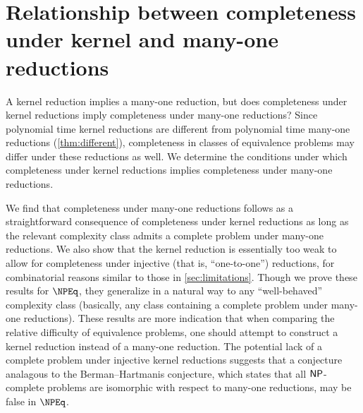 \section
    [Relationship between completeness under kernel and many-one reductions]
    {Relationship between completeness \\ under kernel and many-one reductions}
\label{sec:npeqcompleteness}
%
A kernel reduction implies a many-one reduction, but does completeness under kernel reductions imply completeness under many-one reductions?
Since polynomial time kernel reductions are different from polynomial time many-one reductions (\autoref{thm:different}), completeness in classes of equivalence problems may differ under these reductions as well.
We determine the conditions under which completeness under kernel reductions implies completeness under many-one reductions.

%
We find that completeness under many-one reductions follows as a straightforward consequence of completeness under kernel reductions as long as the relevant complexity class admits a complete problem under many-one reductions.
We also show that the kernel reduction is essentially too weak to allow for completeness under injective (that is, ``one-to-one'') reductions, for combinatorial reasons similar to those in \autoref{sec:limitations}.
Though we prove these results for $\NPEq$, they generalize in a natural way to any ``well-behaved'' complexity class (basically, any class containing a complete problem under many-one reductions).
These results are more indication that when comparing the relative difficulty of equivalence problems, one should attempt to construct a kernel reduction instead of a many-one reduction.
The potential lack of a complete problem under injective kernel reductions suggests that a conjecture analagous to the Berman--Hartmanis conjecture, which states that all ${\mathsf{NP}}$-complete problems are isomorphic with respect to many-one reductions, may be false in $\NPEq$.

